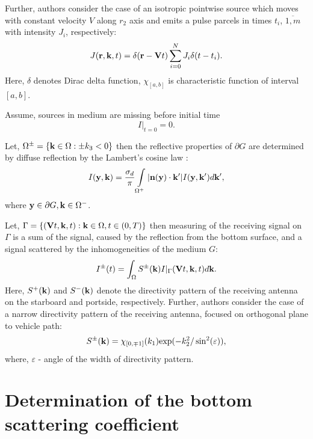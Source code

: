 \documentclass{procDDs}
\begin{document}
Further, authors consider the case of an isotropic pointwise source which moves with constant velocity $V$ along $r_2$ axis and emits a pulse parcels in times $t_i$, $\overline{1,m}$ with intensity $J_i$, respectively: 
\begin{equation}
\label{source}
J(\mathbf{r},\mathbf{k}, t) = \delta(\mathbf{r} - \mathbf{V} t)\sum\limits_{i=0}^{N} J_i \delta(t-t_i).
\end{equation}
Here, $\delta$ denotes Dirac delta function, $\chi_{[a,b]}$ is characteristic function of interval $[a,b]$.

Assume, sources in medium are missing before initial time
\begin{equation}
\label{init_cond}
I\rvert_{t=0}=0.
\end{equation}

Let, $\Omega^\pm = \{\mathbf{k} \in \Omega: \pm k_3 < 0\}$ then the reflective properties of $\partial G$  are determined by diffuse reflection by the Lambert’s cosine law \cite{SPIE_KOV, Prokh_Sush_Kim_2017}:
\begin{equation}
\label{boundary_condition}
I(\mathbf{y},\mathbf{k}) = \frac{\sigma_d}{\pi} \int\limits_{\Omega ^+}|\mathbf{n}(\mathbf{y})\cdot \mathbf{k}'| I(\mathbf{y},\mathbf{k}') d\mathbf{k}' ,
\end{equation}
where  $\mathbf{y} \in \partial G, \mathbf{k} \in \Omega^-$.


Let, $\Gamma = \{ (\mathbf{V}t, \mathbf{k}, t): \mathbf{k} \in \Omega, t \in (0,T) \}$  then measuring of the receiving signal on $\Gamma$ is a sum of the signal, caused by the reflection from the bottom surface, and a signal scattered by the inhomogeneities of the medium $G$:
\begin{equation}
	\label{sum_sig}
	I^\pm(t) = \int_{\Omega} S^\pm(\mathbf{k}) I|_{\Gamma}(\mathbf{V}t, \mathbf{k}, t)d\mathbf{k}.
\end{equation}
Here, $S^+(\mathbf{k})$ and $S^-(\mathbf{k})$ denote the directivity pattern of the receiving antenna on the starboard and portside, respectively. Further, authors consider the case of a narrow directivity pattern of the receiving antenna, focused on orthogonal plane to vehicle path:
\begin{equation}
\label{diagram}
S^\pm(\mathbf{k}) = \chi_{[0,\mp1]}(k_1)  \text{exp}(-k_2^2/\sin^2(\varepsilon)),
\end{equation}
where, $\varepsilon $ - angle of the width of directivity pattern.

\section{Determination of the bottom scattering coefficient}
\end{document}
